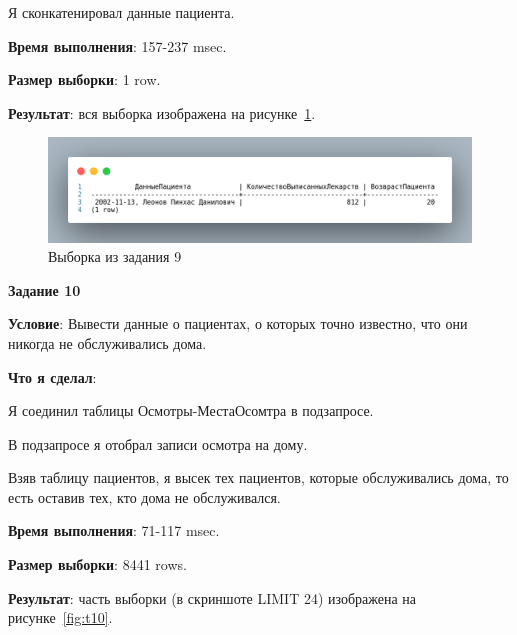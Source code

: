 Я сконкатенировал данные пациента.



\textbf{Время выполнения}: 157-237 msec.

\textbf{Размер выборки}: 1 row.

\textbf{Результат}: вся выборка изображена на рисунке~\ref{fig:t9}.

\begin{figure}[!h]
  \centering

  \includegraphics[width=16cm]
  {../sql/task9/9-out.png}

  \caption{Выборка из задания 9}

  \label{fig:t9}
\end{figure}

\newpage


\begin{center}
  \textbf{Задание 10}
\end{center}
  
\textbf{Условие}:
Вывести данные о пациентах, о которых точно известно, что они никогда не обслуживались дома.

\textbf{Что я сделал}:

Я соединил таблицы Осмотры-МестаОсомтра в подзапросе.

В подзапросе я отобрал записи осмотра на дому.

Взяв таблицу пациентов, я высек тех пациентов, которые обслуживались дома, то есть оставив тех, кто дома не обслуживался. 



\textbf{Время выполнения}: 71-117 msec.

\textbf{Размер выборки}: 8441 rows.

\textbf{Результат}: часть выборки (в скриншоте LIMIT 24) изображена на рисунке~\ref{fig:t10}.

